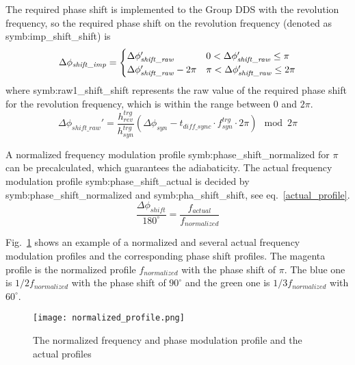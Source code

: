 The required phase shift is implemented to the Group DDS with the revolution frequency, so the required phase shift on the revolution frequency (denoted as \gls{symb:imp_shift_shift}) is 
\begin{eqnarray}\Delta \phi_\mathit{shift\_imp}=
\begin{cases} 
\Delta \phi_\mathit{shift\_raw}' & 0<\Delta \phi_\mathit{shift\_raw}'\le\pi \cr

\Delta \phi_\mathit{shift\_raw}' -2\pi &  \pi<\Delta \phi_\mathit{shift\_raw}'\le2\pi 
\end{cases}
\end{eqnarray}
where \gls{symb:raw1_shift_shift} represents the raw value of the required phase shift for the revolution frequency, which is within the range between $0$ and $2\pi$.
 \begin{equation}
\Delta \phi_\mathit{shift\_raw}'= \frac{h_{\mathit{rev}}^{trg}}{h_{\mathit{syn}}^{trg}}(\Delta \phi_\mathit{syn}-t_{\mathit{diff\_sync}}  \cdot f_\mathit{syn}^\mathit{trg}\cdot 2\pi) \mod 2\pi 
\end{equation}

A normalized frequency modulation profile \gls{symb:phase_shift_normalized} for $\pi$ can be precalculated, which guarantees the adiabaticity. The actual frequency modulation profile \gls{symb:phase_shift_actual} is decided by \gls{symb:phase_shift_normalized} and \gls{symb:pha_shift_shift}, see eq.~\ref{actual_profile}. 
\begin{equation}
\frac{\Delta \phi_\mathit{shift}}{180^\circ}= \frac{f_{\mathit{actual}}}{f_{\mathit{normalized}}} \label{actual_profile}
\end{equation}

Fig.~\ref{normalized_profile} shows an example of a normalized and several actual frequency  modulation profiles and the corresponding phase shift profiles. The magenta profile is the normalized profile $f_{normalized}$ with the phase shift of $\pi$. The blue one is $1/2 f_{\mathit{normalized}}$ with the phase shift of $90^\circ$ and the green one is $1/3 f_{\mathit{normalized}}$ with $60^\circ$. 

\begin{figure}[!htb]
   \centering   
   \texttt{[image: normalized\_profile.png]}
   \caption{The normalized frequency and phase modulation profile and the actual profiles}
   \label{normalized_profile}
\end{figure}  

